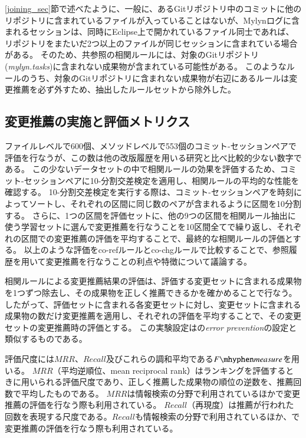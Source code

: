 \documentclass[a4paper]{jsbook}
\newcommand{\fmeasure}{F\mhyphen measure}
\begin{document}
\ref{joining_sec}節で述べたように、一般に、あるGitリポジトリ中のコミットに他のリポジトリに含まれているファイルが入っていることはないが、Mylynログに含まれるセッションは、同時にEclipse上で開かれているファイル同士であれば、リポジトリをまたいだ2つ以上のファイルが同じセッションに含まれている場合がある。
そのため、共参照の相関ルールには、対象のGitリポジトリ({\it mylyn.tasks})に含まれない成果物が含まれている可能性がある。
このようなルールのうち、対象のGitリポジトリに含まれない成果物が右辺にあるルールは変更推薦を必ず外すため、抽出したルールセットから除外した。

\subsection{変更推薦の実施と評価メトリクス}\label{metrics_sec}

ファイルレベルで600個、メソッドレベルで553個のコミット-セッションペアで評価を行なうが、この数は他の改版履歴を用いる研究と比べ比較的少ない数字である。
この少ないデータセットの中で相関ルールの効果を評価するため、コミット-セッションペアに10-分割交差検定を適用し、相関ルールの平均的な性能を確認する。
10-分割交差検定を実行する際は、コミット-セッションペアを時刻によってソートし、それぞれの区間に同じ数のペアが含まれるように区間を10分割する。
さらに、1つの区間を評価セットに、他の9つの区間を相関ルール抽出に使う学習セットに選んで変更推薦を行なうことを10区間全てで繰り返し、それぞれの区間での変更推薦の評価を平均することで、最終的な相関ルールの評価とする。
以上のような評価をco-refルールとco-chgルールで比較することで、参照履歴を用いて変更推薦を行なうことの利点や特徴について議論する。

相関ルールによる変更推薦結果の評価は、評価する変更セットに含まれる成果物を1つずつ除去し、その成果物を正しく推薦できるかを確かめることで行なう。
したがって、評価セットに含まれる各変更セットに対し、変更セットに含まれる成果物の数だけ変更推薦を適用し、それぞれの評価を平均することで、その変更セットの変更推薦時の評価とする。
この実験設定は\cite{Zimmermann:2005}の{\it error prevention}の設定と類似するものである。

評価尺度には$MRR$、$Recall$及びこれらの調和平均である$\fmeasure$を用いる。
$MRR$（平均逆順位、mean reciprocal rank）はランキングを評価するときに用いられる評価尺度であり、正しく推薦した成果物の順位の逆数を、推薦回数で平均したものである。
$MRR$は情報検索の分野で利用されているほか\cite{6233415}で変更推薦の評価を行なう際も利用されている。
$Recall$（再現度）は推薦が行われた回数を表現する尺度である。$Recall$も情報検索の分野で利用されているほか、\cite{Zimmermann:2005}で変更推薦の評価を行なう際も利用されている。
\end{document}
